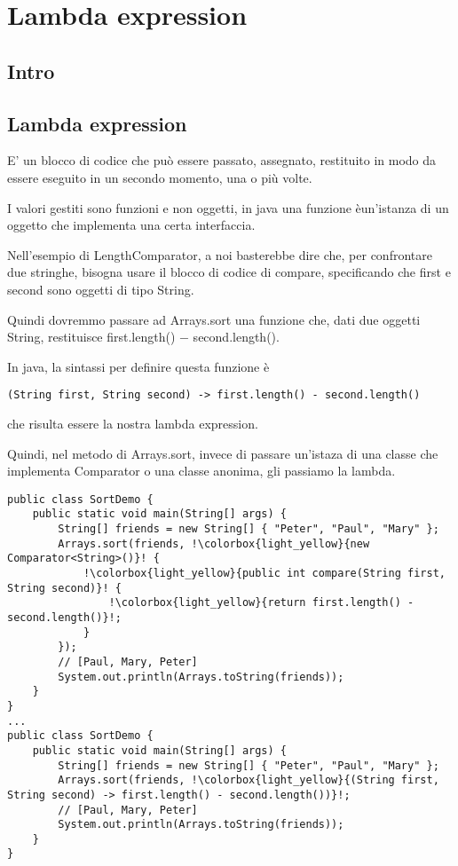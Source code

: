 \chapter{Lambda expression}

\section{Intro}


\section{Lambda expression}
E' un blocco di codice che può essere passato, assegnato, restituito in modo da essere eseguito in un secondo momento, una o più volte.

I valori gestiti sono funzioni e non oggetti, in java una funzione èun'istanza di un oggetto che implementa una certa interfaccia.

Nell'esempio di LengthComparator, a noi basterebbe dire che, per confrontare due stringhe, bisogna usare il blocco di codice di compare, specificando che first e 
second sono oggetti di tipo String.

Quindi dovremmo passare ad Arrays.sort una funzione che, dati due oggetti String, restituisce \newline first.length() $-$ second.length().

In java, la sintassi per definire questa funzione è

\begin{lstlisting}
(String first, String second) -> first.length() - second.length()
\end{lstlisting}

che risulta essere la nostra lambda expression.

Quindi, nel metodo di Arrays.sort, invece di passare un'istaza di una classe che implementa Comparator o una classe anonima, gli passiamo la lambda.
\begin{lstlisting}[escapechar=!]
public class SortDemo {
    public static void main(String[] args) {
        String[] friends = new String[] { "Peter", "Paul", "Mary" };
        Arrays.sort(friends, !\colorbox{light_yellow}{new Comparator<String>()}! { 
            !\colorbox{light_yellow}{public int compare(String first, String second)}! {
                !\colorbox{light_yellow}{return first.length() - second.length()}!;
            }
        });
        // [Paul, Mary, Peter]
        System.out.println(Arrays.toString(friends));
    }
}
... 
public class SortDemo {
    public static void main(String[] args) {
        String[] friends = new String[] { "Peter", "Paul", "Mary" };
        Arrays.sort(friends, !\colorbox{light_yellow}{(String first, String second) -> first.length() - second.length())}!;
        // [Paul, Mary, Peter]
        System.out.println(Arrays.toString(friends));
    }
} 
\end{lstlisting}

